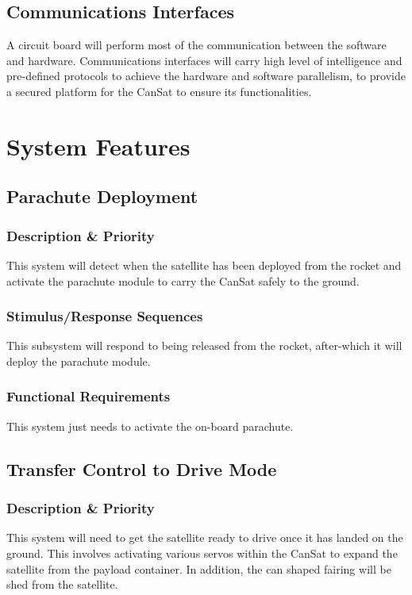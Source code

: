 \documentclass[10pt,onecolumn,draftclsnofoot,document]{IEEEtran}
\begin{document}
\subsection{Communications Interfaces}
A circuit board will perform most of the communication between the software and hardware. Communications interfaces will carry high level of intelligence and pre-defined protocols to achieve the hardware and software parallelism, to provide a secured platform for the CanSat to ensure its functionalities. 

\section{System Features}
\subsection{Parachute Deployment}
\subsubsection{Description \& Priority}
This system will detect when the satellite has been deployed from the rocket and activate the parachute module to carry the CanSat safely to the ground.

\subsubsection{Stimulus/Response Sequences}
This  subsystem will respond to being released from the rocket, after-which it will deploy the parachute module.

\subsubsection{Functional Requirements}
This system just needs to activate the on-board parachute.

\subsection{Transfer Control to Drive Mode}
\subsubsection{Description \& Priority}
This system will need to get the satellite ready to drive once it has landed on the ground. This involves activating various servos within the CanSat to expand the satellite from the payload container. In addition, the can shaped fairing will be shed from the satellite.
\end{document}
